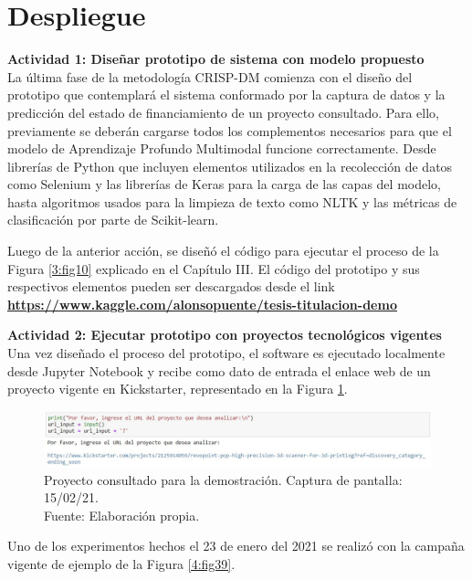 \section{Despliegue}
\textbf{Actividad 1: Diseñar prototipo de sistema con modelo propuesto}
\\
La última fase de la metodología CRISP-DM comienza con el diseño del prototipo que contemplará el sistema conformado por la captura de datos y la predicción del estado de financiamiento de un proyecto consultado. Para ello, previamente se deberán cargarse todos los complementos necesarios para que el modelo de Aprendizaje Profundo Multimodal funcione correctamente. Desde librerías de Python que incluyen elementos utilizados en la recolección de datos como Selenium y las librerías de Keras para la carga de las capas del modelo, hasta algoritmos usados para la limpieza de texto como NLTK y las métricas de clasificación por parte de Scikit-learn.

Luego de la anterior acción, se diseñó el código para ejecutar el proceso de la Figura \ref{3:fig10} explicado en el Capítulo III. El código del prototipo y sus respectivos elementos pueden ser descargados desde el link \textbf{\url{https://www.kaggle.com/alonsopuente/tesis-titulacion-demo}}

\textbf{Actividad 2: Ejecutar prototipo con proyectos tecnológicos vigentes}
\\
Una vez diseñado el proceso del prototipo, el software es ejecutado localmente desde Jupyter Notebook y recibe como dato de entrada el enlace web de un proyecto vigente en Kickstarter, representado en la Figura \ref{4:fig38}.

\begin{figure}[!ht]
	\begin{center}
		\includegraphics[width=1.10\textwidth]{4/figures/prototipo_input_project1.jpg}
		\caption[Proyecto consultado para la demostración. Captura de pantalla: 15/02/21]{Proyecto consultado para la demostración. Captura de pantalla: 15/02/21.\\
			Fuente: Elaboración propia.}
		\label{4:fig38}
	\end{center}
\end{figure}

Uno de los experimentos hechos el 23 de enero del 2021 se realizó con la campaña vigente de ejemplo de la Figura \ref{4:fig39}.

